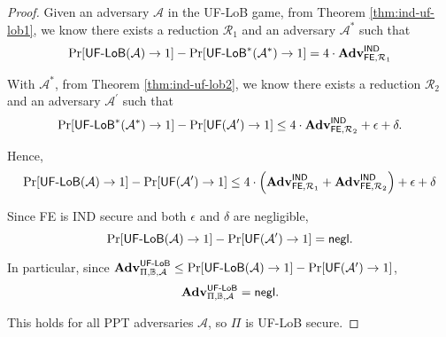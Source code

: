 \begin{proof}

Given an adversary $\mathcal{A}$ in the \textsf{UF-LoB} game, from Theorem \ref{thm:ind-uf-lob1}, we know there exists a reduction $\mathcal{R}_1$ and an adversary $\mathcal{A}^*$ such that
\[
	\Pr[\textsf{UF-LoB}(\mathcal{A}) \to 1] - \Pr[ \textsf{UF-LoB}^*(\mathcal{A}^*) \to 1 ] = 4 \cdot \mathbf{Adv}_{\textsf{FE}, \mathcal{R}_1}^\textsf{IND}
\]

With $\mathcal{A}^*$, from Theorem \ref{thm:ind-uf-lob2}, we know there exists a reduction $\mathcal{R}_2$ and an adversary $\mathcal{A}^\prime$ such that 
\[
	\Pr[\textsf{UF-LoB}^*(\mathcal{A}^*) \to 1] - \Pr[\textsf{UF}(\mathcal{A}^\prime) \to 1] \leq 4 \cdot \mathbf{Adv}_{\textsf{FE}, \mathcal{R}_2}^\textsf{IND} + \epsilon + \delta.
\]

Hence,
\[
	\Pr[\textsf{UF-LoB}(\mathcal{A}) \to 1] - \Pr[\textsf{UF}(\mathcal{A}^\prime) \to 1] \leq 4 \cdot \left( \mathbf{Adv}_{\textsf{FE}, \mathcal{R}_1}^\textsf{IND} + \mathbf{Adv}_{\textsf{FE}, \mathcal{R}_2}^\textsf{IND} \right) + \epsilon + \delta
\]

Since \textsf{FE} is \textsf{IND} secure and both $\epsilon$ and $\delta$ are negligible,
\[
	\Pr[\textsf{UF-LoB}(\mathcal{A}) \to 1] - \Pr[\textsf{UF}(\mathcal{A}^\prime) \to 1] = \mathsf{negl}.
\]

\noindent In particular, since $\mathbf{Adv}_{\Pi, \mathbb{B}, \mathcal{A}}^{\textsf{UF-LoB}} \leq \Pr[\textsf{UF-LoB}(\mathcal{A}) \to 1] - \Pr[\textsf{UF}(\mathcal{A}^\prime) \to 1]$,
\[
	\mathbf{Adv}_{\Pi, \mathbb{B}, \mathcal{A}}^{\textsf{UF-LoB}} = \mathsf{negl}.
\]

\noindent This holds for all PPT adversaries $\mathcal{A}$, so $\Pi$ is UF-LoB secure.

\end{proof}

\iffalse
\begin{theorem}

For any distribution family $\mathbb{B}$, if \textsf{FE} is IND secure, then $\forall \mathcal{A}$ in the \textsf{UF-LoB} game where the auxiliary information $\textsf{option}$ includes $\mathcal{O}_\textsf{Probe}$,
	\[
		\Pr[\textsf{UF-LoB}_{\Pi, \mathbb{B}, \textsf{O}_{\textsf{Probe}}}(\mathcal{A}) \to 1] - \Pr[\textsf{UF-LoB}^*_{\Pi, \mathbb{B}, \textsf{O}_{\textsf{Probe}}}(\mathcal{A}^*) \to 1] = \negl.
	\]
	where $\mathcal{A}^*$ is an adversary in the $\textsf{UF-LoB}^*$ game which runs $\mathcal{A}$ and simulates oracle $\mathcal{O}_{\mathcal{B}}$ by $\mathcal{O}_{\sf samp}(i^*)$ for some index $i^*$ that is never queried by $\mathcal{A}$ in $\mathcal{O}_{\sf samp}(\cdot)$.

\end{theorem}
\fi


% 

\nocite{*}
\printbibliography




